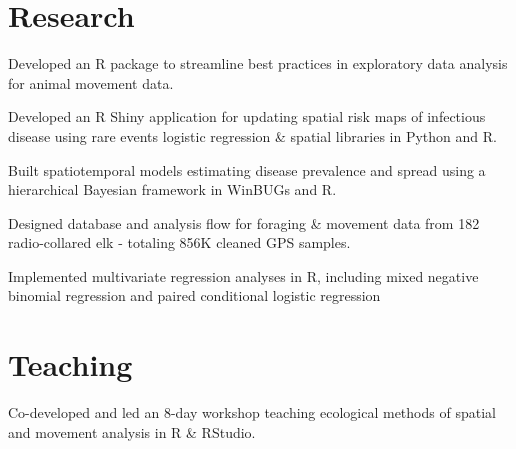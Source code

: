 \documentclass[]{deedy-resume-openfont}
\begin{document}
\begin{minipage}[t]{0.66\textwidth}

\section{Research}
\location{} %
\begin{tightemize}
\item Developed an R package to streamline best practices in exploratory data analysis for animal movement data.
\item Developed an R Shiny application for updating spatial risk maps of infectious disease using rare events logistic regression \& spatial libraries in Python and R. \href{https://fw-habitat-aep.shinyapps.io/ABCWD_Shiny/}{\faGlobe} \href{https://github.com/dpseidel/ABCWD_Shiny}{\faGithub}
\item Built spatiotemporal models estimating disease prevalence and spread using a hierarchical Bayesian framework in WinBUGs and R.\\
\end{tightemize}
\location{} %
\begin{tightemize}
\item Designed database and analysis flow for foraging \& movement data from 182 radio-collared elk - totaling 856K cleaned GPS samples.
\item Implemented multivariate regression analyses in R, including mixed negative binomial regression and paired conditional logistic regression 
\end{tightemize}
\sectionsep


\section{Teaching}
 
 Co-developed and led an 8-day workshop teaching ecological methods of spatial and movement analysis in R \& RStudio. \href{https://www.danaseidel.com/MovEco-R-Workshop/}{\faGlobe} \href{https://github.com/dpseidel/MovEco-R-Workshop/}{\faGithub} 
\vspace{4pt}


\end{minipage}
\end{document}
